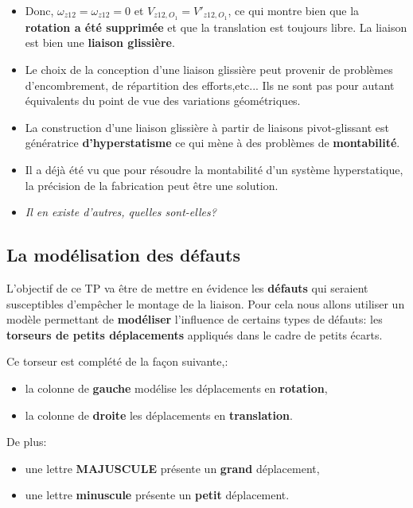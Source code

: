 \begin{itemize}
 \item Donc, $\omega_{z12}=\omega_{z12}=0$ et $V_{z12,O_{1}}=V'_{z12,O_{1}}$, ce qui montre bien que la \textbf{rotation a été supprimée} et que la translation est toujours libre. La liaison est bien une \textbf{liaison glissière}.
 \item Le choix de la conception d'une liaison glissière peut provenir de problèmes d'encombrement, de répartition des efforts,etc... Ils ne sont pas pour autant équivalents du point de vue des variations géométriques.
 \item La construction d'une liaison glissière à partir de liaisons pivot-glissant est génératrice \textbf{d'hyperstatisme} ce qui mène à des problèmes de \textbf{montabilité}.
 \item Il a déjà été vu que pour résoudre la montabilité d'un système hyperstatique, la précision de la fabrication peut être une solution.
 \item \textit{Il en existe d'autres, quelles sont-elles?}
\end{itemize}

\subsection{La modélisation des défauts}

L'objectif de ce TP va être de mettre en évidence les \textbf{défauts} qui seraient susceptibles d'empêcher le montage de la liaison. Pour cela nous allons utiliser un modèle permettant de \textbf{modéliser} l'influence de certains types de défauts: les \textbf{torseurs de petits déplacements} appliqués dans le cadre de petits écarts.

\vspace{1cm}

Ce torseur est complété de la façon suivante,:
\begin{itemize}
 \item la colonne de \textbf{gauche} modélise les déplacements en \textbf{rotation},
 \item la colonne de \textbf{droite} les déplacements en \textbf{translation}.
\end{itemize}

De plus:
\begin{itemize}
 \item une lettre \textbf{MAJUSCULE} présente un \textbf{grand} déplacement,
 \item une lettre \textbf{minuscule} présente un \textbf{petit} déplacement.
\end{itemize}

